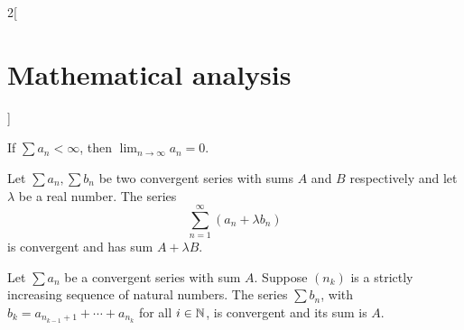 \documentclass[../../../main.tex]{subfiles}
\begin{document}
\begin{multicols}{2}[\section{Mathematical analysis}]
  \begin{corollary}
    If $\sum a_n<\infty$, then $\displaystyle\lim_{n\to \infty} a_n=0$.
  \end{corollary}
  \begin{theorem}[Linearity]
    Let $\sum a_n,\sum b_n$ be two convergent series with sums $A$ and $B$ respectively and let $\lambda$ be a real number. The series $$\sum_{n=1}^\infty (a_n+\lambda b_n)$$ is convergent and has sum $A+\lambda B$.
  \end{theorem}
  \begin{theorem}
    Let $\sum a_n$ be a convergent series with sum $A$. Suppose $(n_k)$ is a strictly increasing sequence of natural numbers. The series $\sum b_n$, with $b_k=a_{n_{k-1}+1}+\cdots+a_{n_k}$ for all $i\in\mathbb{N} $, is convergent and its sum is $A$.
  \end{theorem}

\end{multicols}
\end{document}
